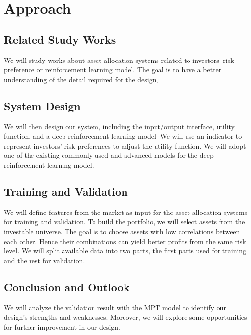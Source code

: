 \chapter{Approach}
\section{Related Study Works}
We will study works about asset allocation systems related to investors' risk preference or reinforcement learning model. The goal is to have a better understanding of the detail required for the design, 

\section{System Design}
We will then design our system, including the input/output interface, utility function, and a deep reinforcement learning model. We will use an indicator to represent investors' risk preferences to adjust the utility function. We will adopt one of the existing commonly used and advanced models for the deep reinforcement learning model.
\section{Training and Validation}
We will define features from the market as input for the asset allocation systems for training and validation.
To build the portfolio, we will select assets from the investable universe. The goal is to choose assets with low correlations between each other. Hence their combinations can yield better profits from the same risk level.
We will split available data into two parts, the first parts used for training and the rest for validation.
\section{Conclusion and Outlook}
We will analyze the validation result with the MPT model to identify our design's strengths and weaknesses. Moreover, we will explore some opportunities for further improvement in our design.


